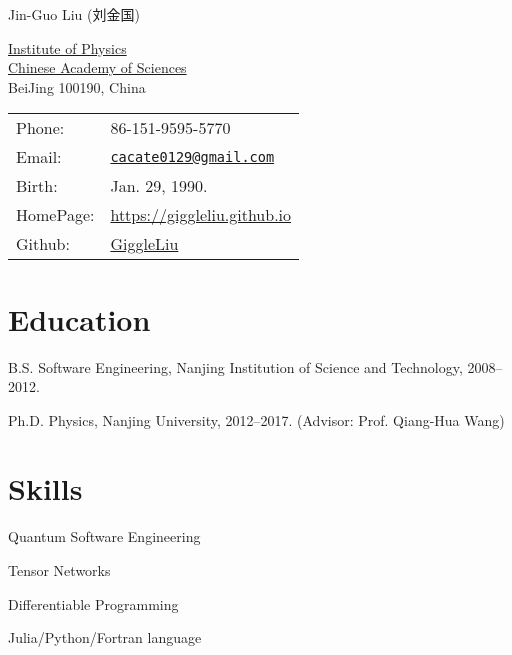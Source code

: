 \documentclass[letterpaper]{article}
\def\name{Jin-Guo Liu (刘金国)}
\renewenvironment{itemize}{
  \begin{list}{}{
    \setlength{\leftmargin}{1.5em}
  }
}{
  \end{list}
}
\begin{document}
{\huge \name}


\vspace{0.2in}

\begin{minipage}{0.45\linewidth}
    \href{http://english.iop.cas.cn/}{Institute of Physics\\
    Chinese Academy of Sciences}\\
    BeiJing 100190, China
\end{minipage}
\begin{minipage}{0.45\linewidth}
    \begin{tabular}{ll}
        Phone: & 86-151-9595-5770 \\
        Email: & \href{mailto:cacate0129@gmail.com}{\tt cacate0129@gmail.com} \\
        Birth: & Jan. 29, 1990.\\
        HomePage: & \href{https://giggleliu.github.io}{https://giggleliu.github.io}\\
        Github: & \href{https://github.com/GiggleLiu}{GiggleLiu}
    \end{tabular}
\end{minipage}



\section*{Education}

\begin{itemize}
    \item B.S. Software Engineering, Nanjing Institution of Science and Technology, 2008--2012.
    \item Ph.D. Physics, Nanjing University, 2012--2017. (Advisor: Prof. Qiang-Hua Wang)
\end{itemize}

\section*{Skills}
\begin{itemize}
    \item Quantum Software Engineering
    \item Tensor Networks
    \item Differentiable Programming
    \item Julia/Python/Fortran language
\end{itemize}
\end{document}
